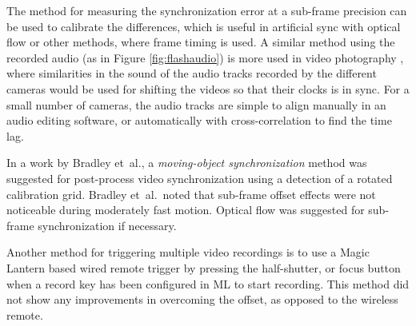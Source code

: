 


The method for measuring the synchronization error at a sub-frame precision can be used to calibrate the differences, which is useful in artificial sync with optical flow or other methods, where frame timing is used.
A similar method using the recorded audio (as in Figure \ref{fig:flashaudio}) is more used in video photography \cite{pluraleyes,premierepromerge}, where similarities in the sound of the audio tracks recorded by the different cameras would be used for shifting the videos so that their clocks is in sync.
For a small number of cameras, the audio tracks are simple to align manually in an audio editing software, or automatically with cross-correlation to find the time lag.

In a work by Bradley et~al., a \emph{moving-object synchronization} method \cite{bradley2008markerless} was suggested for post-process video synchronization using a detection of a rotated calibration grid.
Bradley et~al.\ noted that sub-frame offset effects were not noticeable during moderately fast motion.
Optical flow was suggested for sub-frame synchronization if necessary.

Another method for triggering multiple video recordings is to use a Magic Lantern based wired remote trigger by pressing the half-shutter, or focus button when a record key has been configured in ML to start recording.
This method did not show any improvements in overcoming the offset, as opposed to the wireless remote.

